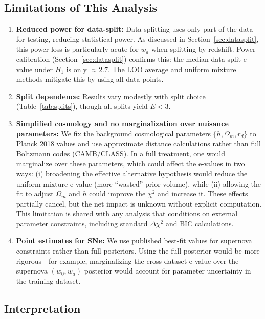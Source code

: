 \documentclass[11pt,a4paper]{article}
\begin{document}
\subsection{Limitations of This Analysis}
\label{sec:limitations}

\begin{enumerate}
    \item \textbf{Reduced power for data-split:} Data-splitting uses only part of the data for testing, reducing statistical power. As discussed in Section~\ref{sec:datasplit}, this power loss is particularly acute for $w_a$ when splitting by redshift. Power calibration (Section~\ref{sec:datasplit}) confirms this: the median data-split e-value under $H_1$ is only $\approx 2.7$. The LOO average and uniform mixture methods mitigate this by using all data points.

    \item \textbf{Split dependence:} Results vary modestly with split choice (Table~\ref{tab:splits}), though all splits yield $E < 3$.

    \item \textbf{Simplified cosmology and no marginalization over nuisance parameters:} We fix the background cosmological parameters $\{h, \Omega_m, r_d\}$ to Planck 2018 values and use approximate distance calculations rather than full Boltzmann codes (CAMB/CLASS). In a full treatment, one would marginalize over these parameters, which could affect the e-values in two ways: (i) broadening the effective alternative hypothesis would reduce the uniform mixture e-value (more ``wasted'' prior volume), while (ii) allowing the fit to adjust $\Omega_m$ and $h$ could improve the $\chi^2$ and increase it. These effects partially cancel, but the net impact is unknown without explicit computation. This limitation is shared with any analysis that conditions on external parameter constraints, including standard $\Delta\chi^2$ and BIC calculations.

    \item \textbf{Point estimates for SNe:} We use published best-fit values for supernova constraints rather than full posteriors. Using the full posterior would be more rigorous---for example, marginalizing the cross-dataset e-value over the supernova $(w_0, w_a)$ posterior would account for parameter uncertainty in the training dataset.
\end{enumerate}

\subsection{Interpretation}
\end{document}
